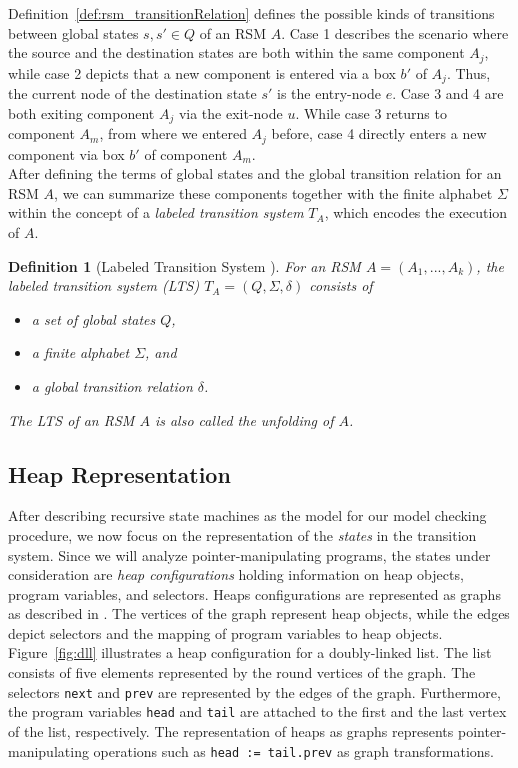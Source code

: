\documentclass[a4paper, 12pt, twoside]{report}
\theoremstyle{plain}
\newtheorem{definition}[theorem]{Definition}
\begin{document}
	Definition~\ref{def:rsm_transitionRelation} defines the possible kinds of transitions between global states $s, s' \in Q$ of an RSM $A$. Case 1 describes the scenario where the source and the destination states are both within the same component $A_j$, while case 2 depicts that a new component is entered via a box $b'$ of $A_j$. Thus, the current node of the destination state $s'$ is the entry-node $e$. Case 3 and 4 are both exiting component $A_j$ via the exit-node $u$. While case 3 returns to component $A_m$, from where we entered $A_j$ before, case 4 directly enters a new component via box $b'$ of component $A_m$.\\
	
	
	After defining the terms of global states and the global transition relation for an RSM $A$, we can summarize these components together with the finite alphabet $\Sigma$ within the concept of a \textit{labeled transition system} $T_A$, which encodes the execution of $A$.
	
	\begin{definition}[Labeled Transition System \cite{alur2001analysis}]\label{def:rsm_transitionSystem}
		For an RSM $A=(A_1, ..., A_k)$, the \textup{labeled transition system} (LTS) $T_A=(Q, \Sigma, \delta)$ consists of
		\begin{itemize}
			\item a set of global states $Q$, 
			\item a finite alphabet $\Sigma$, and
			\item a global transition relation $\delta$.
		\end{itemize}		
		The LTS of an RSM $A$ is also called the \textup{unfolding} of $A$.
	\end{definition}
	
	\subsection{Heap Representation}
	
	After describing recursive state machines as the model for our model checking procedure, we now focus on the representation of the \textit{states} in the transition system. Since we will analyze pointer-manipulating programs, the states under consideration are \textit{heap configurations} holding information on heap objects, program variables, and selectors. Heaps configurations are represented as graphs as described in \cite{heinen2015verifying}. The vertices of the graph represent heap objects, while the edges depict selectors and the mapping of program variables to heap objects. Figure~\ref{fig:dll} illustrates a heap configuration for a doubly-linked list. The list consists of five elements represented by the round vertices of the graph. The selectors \texttt{next} and \texttt{prev} are represented by the edges of the graph. Furthermore, the program variables \texttt{head} and \texttt{tail} are attached to the first and the last vertex of the list, respectively. The representation of heaps as graphs represents pointer-manipulating operations such as \texttt{head := tail.prev} as graph transformations.
	
\end{document}
